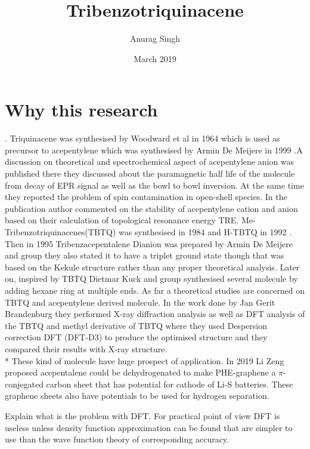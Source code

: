 \documentclass{article}
\title{Tribenzotriquinacene}
\author{Anurag Singh }
\date{March 2019}
\begin{document}
\maketitle

\pagebreak


\section{Why this research}.
Triquinacene was synthesised by Woodward et al in 1964 \cite{Woodward1964} which is used as precursor to acepentylene which was synthesised by Armin De Meijere in 1999 \cite{Haag1995}.A discussion on theoretical and spectrochemical aspect of acepentylene anion was published there they discussed about the paramagnetic half life of the molecule from decay of EPR signal as well as the bowl to bowl inversion. At the same time they reported the problem of spin contamination in open-shell species. In the publication \cite{Gutman1977} author commented on the stability of acepentylene cation and anion based on their calculation of topological resonance energy TRE. Me-Tribenzotriquinacenes(TBTQ) was synthesised in 1984 \cite{Kuck1984} and H-TBTQ in 1992 \cite{kuck1992}. Then in 1995 Tribenzacepentalene Dianion was prepared by Armin De Meijere and group \cite{Haag1995}they also stated it to have a triplet ground state though that was based on the Kekule structure rather than any proper theoretical analysis. Later on, inspired by TBTQ Dietmar Kuck and group synthesised several molecule by adding hexane ring at multiple ends\cite{Brandenburg2013}. As far a theoretical studies are concerned on TBTQ and acepentylene derived molecule. In the work done by Jan Gerit Brandenburg they performed X-ray diffraction analysis as well as DFT analysis of the TBTQ and methyl derivative of TBTQ where they used Despersion correction DFT (DFT-D3) to produce the optimised structure and they compared their results with X-ray structure. \cite{Brandenburg2013}  \\*
These kind of molecule have huge prospect of application. In 2019 Li Zeng proposed acepentalene could be dehydrogenated to make PHE-graphene a \(\pi\)-conjegated carbon sheet that has potential for cathode  of Li-S batteries\cite{Zeng2019}. These graphene sheets also have potentials to be used for hydrogen separation\cite{Zhu2015}.

\iffalse
Explain what is the problem with DFT.
For practical point of view DFT is useless unless density function approximation can be found that are simpler to use than the wave function theory of corresponding accuracy.
\end{document}
